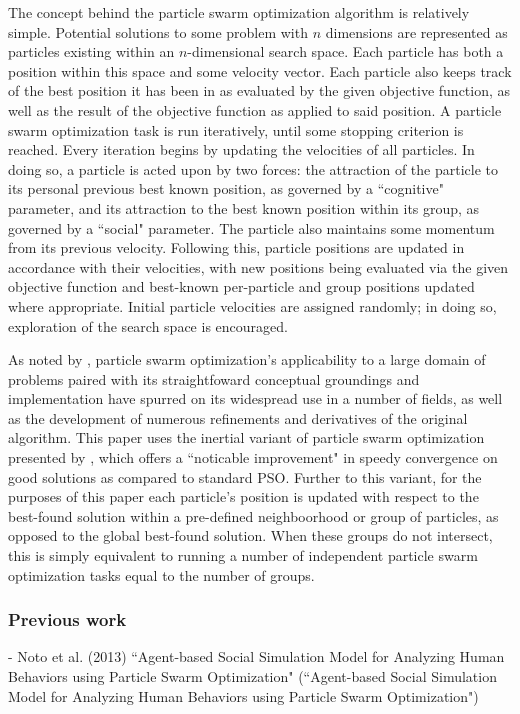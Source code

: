 \documentclass[12pt]{article}
\begin{document}
The concept behind the particle swarm optimization algorithm is relatively simple. Potential solutions to some problem with $n$ dimensions are represented as particles existing within an $n$-dimensional search space. Each particle has both a position within this space and some velocity vector. Each particle also keeps track of the best position it has been in as evaluated by the given objective function, as well as the result of the objective function as applied to said position. A particle swarm optimization task is run iteratively, until some stopping criterion is reached. Every iteration begins by updating the velocities of all particles. In doing so, a particle is acted upon by two forces: the attraction of the particle to its personal previous best known position, as governed by a ``cognitive" parameter, and its attraction to the best known position within its group, as governed by a ``social" parameter. The particle also maintains some momentum from its previous velocity. Following this, particle positions are updated in accordance with their velocities, with new positions being evaluated via the given objective function and best-known per-particle and group positions updated where appropriate. Initial particle velocities are assigned randomly; in doing so, exploration of the search space is encouraged. 

As noted by \cite{yang2014},
particle swarm optimization's applicability to a large domain of problems paired with its straightfoward conceptual groundings and implementation have spurred on its widespread use in a number of fields, as well as the development of numerous refinements and derivatives of the original algorithm. This paper uses the inertial variant of particle swarm optimization presented by \cite{yang2014},
which offers a ``noticable improvement" in speedy convergence on good solutions as compared to standard PSO. Further to this variant, for the purposes of this paper each particle's position is updated with respect to the best-found solution within a pre-defined neighboorhood or group of particles, as opposed to the global best-found solution. When these groups do not intersect, this is simply equivalent to running a number of independent particle swarm optimization tasks equal to the number of groups.


\subsubsection{Previous work}
- Noto et al. (2013) ``Agent-based Social Simulation Model for Analyzing Human Behaviors using Particle Swarm Optimization" (``Agent-based Social Simulation Model for Analyzing Human Behaviors using Particle Swarm Optimization")
\end{document}
